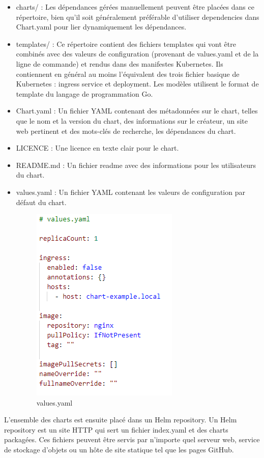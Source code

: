 \documentclass[11pt,fleqn]{book} %
\begin{document}
\begin{itemize}
        \item charts/ : Les dépendances gérées manuellement peuvent être placées dans ce répertoire, bien qu'il soit généralement préférable d'utiliser dependencies dans Chart.yaml pour lier dynamiquement les dépendances.
        \item templates/ : Ce répertoire contient des fichiers templates qui vont être combinés avec des valeurs de configuration (provenant de values.yaml et de la ligne de commande) et rendus dans des manifestes Kubernetes. Ils contiennent en général au moins l'équivalent des trois fichier basique de Kubernetes : ingress service et deployment. Les modèles utilisent le format de template du langage de programmation Go.
        \item Chart.yaml : Un fichier YAML contenant des métadonnées sur le chart, telles que le nom et la version du chart, des informations sur le créateur, un site web pertinent et des mots-clés de recherche, les dépendances du chart.
      \item LICENCE : Une licence en texte clair pour le chart.
     \item README.md : Un fichier readme avec des informations pour les utilisateurs du chart.
      \item values.yaml : Un fichier YAML contenant les valeurs de configuration par défaut du chart.\newline
        \begin{figure}[H]\centering
        \renewcommand{\figurename}{Tableau}
        \includegraphics[scale=0.8]{Pictures/Comparaison/deployer/Kubernetes/values.png}
        \captionsetup{margin=1.5cm,format=hang,justification=justified}
        \caption[]{values.yaml \newline}
        \end{figure}
\end{itemize} 
L'ensemble des charts est ensuite placé dans un Helm repository. Un Helm repository est un site HTTP qui sert un fichier index.yaml et des charts packagées. Ces fichiers peuvent être servis par n'importe quel serveur web, service de stockage d'objets ou un hôte de site statique tel que les pages GitHub.
\end{document}
